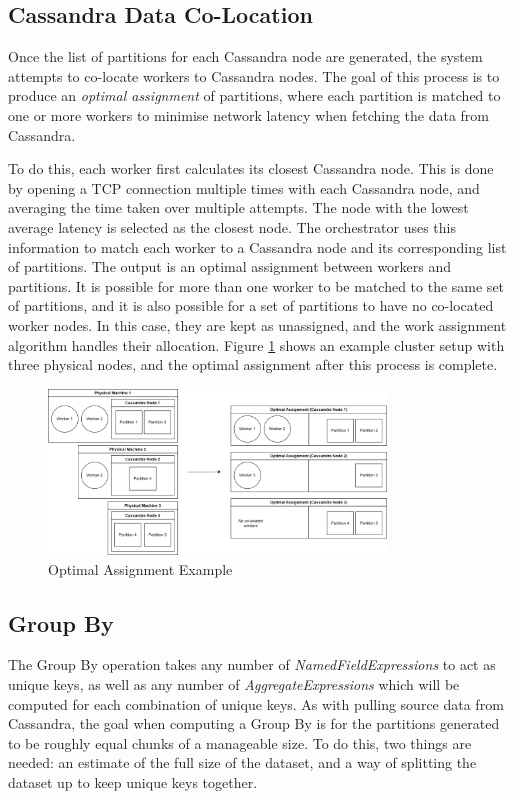 \subsection{Cassandra Data Co-Location}\label{subsec:colocation}
Once the list of partitions for each Cassandra node are generated, the system attempts to co-locate workers to Cassandra nodes. The goal of this process is to produce an \textit{optimal assignment} of partitions, where each partition is matched to one or more workers to minimise network latency when fetching the data from Cassandra.

To do this, each worker first calculates its closest Cassandra node. This is done by opening a TCP connection multiple times with each Cassandra node, and averaging the time taken over multiple attempts. The node with the lowest average latency is selected as the closest node. The orchestrator uses this information to match each worker to a Cassandra node and its corresponding list of partitions. The output is an optimal assignment between workers and partitions. It is possible for more than one worker to be matched to the same set of partitions, and it is also possible for a set of partitions to have no co-located worker nodes. In this case, they are kept as unassigned, and the work assignment algorithm handles their allocation. Figure \ref{fig:optimal-assignment-example} shows an example cluster setup with three physical nodes, and the optimal assignment after this process is complete.

\begin{figure}[h]
	\centering
	\includegraphics[width=0.8\textwidth]{chapters/diagrams/implementation/optimal-assignment-example}
	\caption{Optimal Assignment Example}
	\label{fig:optimal-assignment-example}
\end{figure}

\subsection{Group By}\label{subsec:group-by}
The Group By operation takes any number of \textit{NamedFieldExpressions} to act as unique keys, as well as any number of \textit{AggregateExpressions} which will be computed for each combination of unique keys. As with pulling source data from Cassandra, the goal when computing a Group By is for the partitions generated to be roughly equal chunks of a manageable size. To do this, two things are needed: an estimate of the full size of the dataset, and a way of splitting the dataset up to keep unique keys together. 

